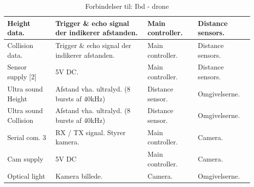 \begin{table}[H]
\begin{tabular}	{|p{3.1 cm}|p{5.2 cm}|p{2.3 cm}|p{2.3 cm}|}
			Height data.		& Trigger \& echo signal der \newline indikerer afstanden. 	& Main \newline controller.	& Distance \newline sensors.	\\ \hline
			Collision data.		& Trigger \& echo signal der \newline indikerer afstanden. 	& Main \newline controller.	& Distance \newline sensors.  \\ \hline
			Sensor supply [2]	& 5V DC.	& Main \newline controller. & Distance \newline sensors.	\\ \hline
			Ultra sound \newline Height			& Afstand vha. ultralyd. \newline (8 bursts af 40kHz) 	& Distance \newline sensor.	& Omgivelserne.	\\ \hline 
			Ultra sound \newline	Collision		& Afstand vha. ultralyd. \newline (8 bursts af 40kHz) 	& Distance \newline sensor.	& Omgivelserne.	\\ \hline 			
				
			Serial com. 3		& RX / TX signal. \newline Styrer kamera.	& Main \newline controller.	& Camera.	\\ \hline
			Cam supply			& 5V DC 	& Main \newline controller.	& Camera.	\\ \hline
			Optical light		& Kamera billede. 	& Camera.	& Omgivelserne.	\\ \hline	
			
		\end{tabular}
	\caption{Forbindelser til: Ibd - drone}
	\label{tab:IBDdrone}
\end{table}

